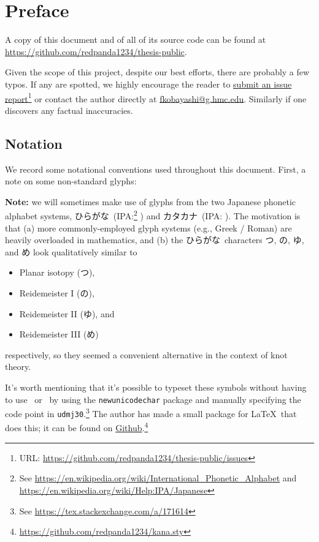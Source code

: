 \chapter{Preface}\label{chap:preface}

A copy of this document and of all of its source code can be found at
\url{https://github.com/redpanda1234/thesis-public}.

Given the scope of this project, despite our best efforts, there are
probably a few typos. If any are spotted, we highly encourage the
reader to
\href{https://github.com/redpanda1234/thesis-public/issues}{submit an
  issue report}\footnote{URL:
  \url{https://github.com/redpanda1234/thesis-public/issues}} or
contact the author directly at
\href{mailto:fkobayashi@g.hmc.edu}{fkobayashi@g.hmc.edu}. Similarly if
one discovers any factual inaccuracies.



\section*{Notation}
\newcommand{\hiragana}{ひらがな}
\newcommand{\katakana}{カタカナ}
We record some notational conventions used throughout this document.
First, a note on some non-standard glyphs:
\begin{leftbar}
  \textbf{Note:} we will sometimes make use of glyphs from the two
  Japanese phonetic alphabet systems, \hiragana\ (IPA:\footnote{See
    \href{https://en.wikipedia.org/wiki/International\_Phonetic\_Alphabet}{https://en.wikipedia.org/wiki/International\_Phonetic\_Alphabet}
    and
    \href{https://en.wikipedia.org/wiki/Help:IPA/Japanese}{https://en.wikipedia.org/wiki/Help:IPA/Japanese}}
  ) and \katakana\ (IPA:
  ). The motivation is that (a) more
  commonly-employed glyph systems (e.g., Greek / Roman) are heavily
  overloaded in mathematics, and (b) the \hiragana\ characters $つ$,
  $の$, $ゆ$, and $め$ look qualitatively similar to
  \begin{itemize}
    \item Planar isotopy (つ),
    \item Reidemeister I (の),
    \item Reidemeister II (ゆ), and
    \item Reidemeister III (め)
  \end{itemize}
  respectively, so they seemed a convenient alternative in the
  context of knot theory.

  It's worth mentioning that it's possible to typeset these symbols
  without having to use \XeLaTeX\ or \LuaLaTeX\ by using the
  \texttt{newunicodechar} package and manually specifying the code
  point in \texttt{udmj30}.\footnote{See
    \href{https://tex.stackexchange.com/a/171614}{https://tex.stackexchange.com/a/171614}}
  The author has made a small package for \LaTeX\ that does this; it
  can be found on
  \href{https://github.com/redpanda1234/kana.sty}{Github}.\footnote{\url{https://github.com/redpanda1234/kana.sty}}
\end{leftbar}



